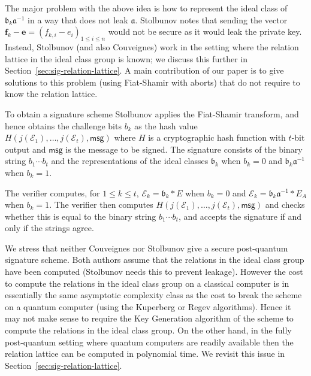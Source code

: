 \documentclass{llncs}
\newcommand{\E}{\mathcal{E}}
\newcommand{\msg}{\mathsf{msg}}
\renewcommand{\a}{\mathfrak{a}}
\renewcommand{\b}{\mathfrak{b}}
\renewcommand{\l}{\mathfrak{l}}
\newcommand{\e}{\mathbf{e}}
\newcommand{\f}{\mathbf{f}}
\begin{document}
The major problem with the above idea is how to represent the ideal class of $\b_k \a^{-1}$ in a way that does not leak $\a$.
Stolbunov notes that sending the vector $\f_k - \e = (f_{k,i} - e_i )_{1 \le i \le n}$ would not be secure as it would leak the private key.
Instead, Stolbunov (and also Couveignes) work in the setting where the relation lattice in the ideal class group is known; we discuss this further in Section~\ref{sec:sig-relation-lattice}.
%
A main contribution of our paper is to give solutions to this problem (using Fiat-Shamir with aborts) that do not require to know the relation lattice.

To obtain a signature scheme Stolbunov applies the Fiat-Shamir transform, and hence obtains the challenge bits $b_k$ as the hash value $H( j(\E_1), \dots, j(\E_t) , \msg )$ where $H$ is a cryptographic hash function with $t$-bit output and $\msg$ is the message to be signed.
The signature consists of the binary string $b_1\cdots b_t$ and the representations of the ideal classes $\b_k$ when $b_k = 0$ and $\b_k \a^{-1}$ when $b_k = 1$.

The verifier computes, for $1 \le k \le t$, $\E_k = \b_k * E$ when $b_k = 0$ and $\E_k = \b_k \a^{-1} * E_A$ when $b_k = 1$. The verifier then computes $H( j( \E_1), \dots, j(\E_t), \msg )$ and checks whether this is equal to the binary string $b_1\cdots b_t$, and accepts the signature if and only if the strings agree.


We stress that neither Couveignes nor Stolbunov give a secure post-quantum signature scheme.
Both authors assume that the relations in the ideal class group have been computed (Stolbunov needs this to prevent leakage).
However the cost to compute the relations in the ideal class group on a classical computer is in essentially the same asymptotic complexity class as the cost to break the scheme on a quantum computer (using the Kuperberg or Regev algorithms).
Hence it may not make sense to require the Key Generation algorithm of the scheme to compute the relations in the ideal class group.
On the other hand, in the fully post-quantum setting where quantum computers are readily available then the relation lattice can be computed in polynomial time.
We revisit this issue in Section~\ref{sec:sig-relation-lattice}.
\end{document}
